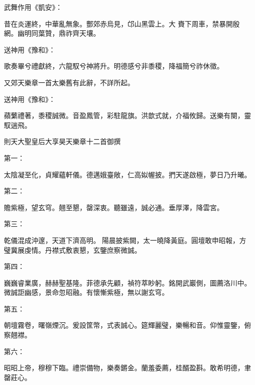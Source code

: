 \begin{pinyinscope}
 武舞作用《凱安》：



 昔在炎運終，中華亂無象。酆郊赤烏見，邙山黑雲上。大
 賚下周車，禁暴開殷網。幽明同葉贊，鼎祚齊天壤。



 送神用《豫和》：



 歌奏畢兮禮獻終，六龍馭兮神將升。明德感兮非黍稷，降福簡兮祚休徵。



 又郊天樂章一首太樂舊有此辭，不詳所起。



 送神用《豫和》：



 蘋蘩禮著，黍稷誠微。音盈鳳管，彩駐龍旗。洪歆式就，介福攸歸。送樂有闋，靈馭遄飛。



 則天大聖皇后大享昊天樂章十二首御撰



 第一：



 太陰凝至化，貞耀蘊軒儀。德邁娥臺敞，仁高姒幄披。捫天遂啟極，夢日乃升曦。



 第二：



 贍紫極，望玄穹。翹至懇，罄深衷。聽雖遠，誠必通。垂厚澤，降雲宮。



 第三：



 乾儀混成沖邃，天道下濟高明。陽晨披紫闕，太一曉降黃庭。圓壇敢申昭報，方璧冀展虔情。丹襟式敷衷懇，玄鑒庶察微誠。



 第四：



 巍巍睿業廣，赫赫聖基隆。菲德承先顧，禎符萃眇躬。銘開武巖側，圖薦洛川中。微誠詎幽感，景命忽昭融。有懷慚紫極，無以謝玄穹。



 第五：



 朝壇霧卷，曙嶺煙沉。爰設筐幣，式表誠心。筵輝麗璧，樂暢和音。仰惟靈鑒，俯察翹襟。



 第六：



 昭昭上帝，穆穆下臨。禮崇備物，樂奏鏘金。蘭羞委薦，桂醑盈斟。敢希明德，聿罄莊心。




\end{pinyinscope}
